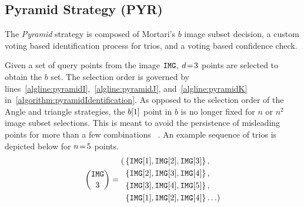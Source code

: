 \subsection{Pyramid Strategy (PYR)}\label{subsec:pyramidMethod}
The \textit{Pyramid} strategy is composed of Mortari's $b$ image subset decision, a custom voting based identification process for trios, and a voting based confidence check.

Given a set of query points from the image $\texttt{IMG}$, $d \!=\! 3$ points are selected to obtain the $b$ set.
The selection order is governed by lines~\ref{algline:pyramidI},~\ref{algline:pyramidJ}, and~\ref{algline:pyramidK} in~\autoref{algorithm:pyramidIdentification}.
As opposed to the selection order of the Angle and triangle strategies, the $b[1]$ point in $b$ is no longer fixed for $n$ or $n^2$ image subset selections.
This is meant to avoid the persistence of misleading points for more than a few combinations
~\cite{mortari:pyramidIdentification}.
An example sequence of trios is depicted below for $n \!=\! 5$ points.
\begin{equation}
    \binom{\texttt{IMG}}{3} = 
    \begin{aligned}
    	( &\left\{ \texttt{IMG}[1], \texttt{IMG}[2], \texttt{IMG}[3] \right\}, \\
    	&\left\{ \texttt{IMG}[2], \texttt{IMG}[3], \texttt{IMG}[4] \right\}, \\
        &\left\{ \texttt{IMG}[3], \texttt{IMG}[4], \texttt{IMG}[5] \right\}, \\
        &\left\{ \texttt{IMG}[1], \texttt{IMG}[2], \texttt{IMG}[4]  \right\}\ldots )
    \end{aligned}
\end{equation}

